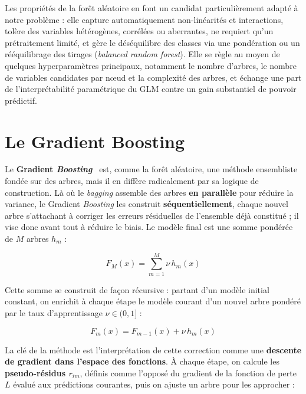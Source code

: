 Les propriétés de la forêt aléatoire en font un candidat particulièrement adapté à notre problème : elle capture automatiquement non-linéarités et interactions, tolère des variables hétérogènes, corrélées ou aberrantes, ne requiert qu'un prétraitement limité, et gère le déséquilibre des classes via une pondération ou un rééquilibrage des tirages (\textit{balanced random forest}). Elle se règle au moyen de quelques hyperparamètres principaux, notamment le nombre d'arbres, le nombre de variables candidates par nœud et la complexité des arbres, et échange une part de l'interprétabilité paramétrique du GLM contre un gain substantiel de pouvoir prédictif.

\section{Le Gradient Boosting}

Le \textbf{Gradient \textit{Boosting}}~\cite{friedman_gbm} est, comme la forêt aléatoire, une méthode ensembliste fondée sur des arbres, mais il en diffère radicalement par sa logique de construction. Là où le \textit{bagging} assemble des arbres \textbf{en parallèle} pour réduire la variance, le Gradient \textit{Boosting} les construit \textbf{séquentiellement}, chaque nouvel arbre s'attachant à corriger les erreurs résiduelles de l'ensemble déjà constitué ; il vise donc avant tout à réduire le biais. Le modèle final est une somme pondérée de $M$ arbres $h_m$ :

\begin{equation}
    F_M(x) = \sum_{m=1}^{M} \nu\, h_m(x)
\end{equation}

Cette somme se construit de façon récursive : partant d'un modèle initial constant, on enrichit à chaque étape le modèle courant d'un nouvel arbre pondéré par le taux d'apprentissage $\nu \in (0, 1]$ :

\begin{equation}
    F_m(x) = F_{m-1}(x) + \nu\, h_m(x)
\end{equation}

La clé de la méthode est l'interprétation de cette correction comme une \textbf{descente de gradient dans l'espace des fonctions}. À chaque étape, on calcule les \textbf{pseudo-résidus $r_{im}$}, définis comme l'opposé du gradient de la fonction de perte $L$ évalué aux prédictions courantes, puis on ajuste un arbre pour les approcher :


